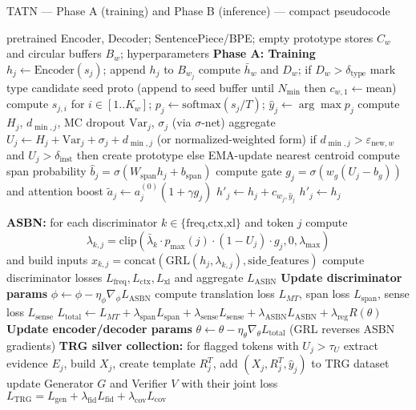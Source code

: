 \documentclass[11pt]{article}
\begin{document}
\begin{algorithm}
\caption{TATN — Phase A (training) and Phase B (inference) — compact pseudocode}
\begin{algorithmic}[1]
\Require pretrained Encoder, Decoder; SentencePiece/BPE; empty prototype stores $C_w$ and circular buffers $B_w$; hyperparameters
\State \textbf{Phase A: Training}
    \State $h_j \leftarrow \mathrm{Encoder}(s_j)$; append $h_j$ to $B_{w_j}$
  \EndFor
    \State compute $\bar h_w$ and $D_w$; if $D_w>\delta_{\text{type}}$ mark type candidate
  \EndFor
      \State seed proto (append to seed buffer until $N_{\min}$ then $c_{w,1}\leftarrow$mean)
    \Else
      \State compute $s_{j,i}$ for $i\in[1..K_w]$; $p_{j}\leftarrow\mathrm{softmax}(s_{j}/T)$; $\hat y_j\leftarrow\arg\max p_j$
      \State compute $H_j$, $d_{\min,j}$, MC dropout $\mathrm{Var}_j$, $\sigma_j$ (via $\sigma$-net)
      \State aggregate $U_j \leftarrow H_j + \mathrm{Var}_j + \sigma_j + d_{\min,j}$ (or normalized-weighted form)
      \State if $d_{\min,j}>\varepsilon_{\text{new},w}$ and $U_j>\delta_{\text{inst}}$ then create prototype else EMA-update nearest centroid
    \EndIf
    \State compute span probability $\hat b_j=\sigma(W_{\text{span}}h_j+b_{\text{span}})$
    \State compute gate $g_j=\sigma(w_g(U_j-b_g))$ and attention boost $\tilde a_j \leftarrow a_j^{(0)}(1+\gamma g_j)$
      \State $h'_j \leftarrow h_j + c_{w_j,\hat y_j}$
    \Else
      \State $h'_j \leftarrow h_j$
    \EndIf
  \EndFor

  \State \textbf{ASBN:} for each discriminator $k\in\{\text{freq,ctx,xl}\}$ and token $j$ compute
    \[
    \lambda_{k,j}=\mathrm{clip}(\bar\lambda_k\cdot p_{\max}(j)\cdot(1-U_j)\cdot g_j,0,\lambda_{\max})
    \]
    and build inputs $x_{k,j}=\mathrm{concat}(\mathrm{GRL}(h_j,\lambda_{k,j}),\text{side\_features})$
  \State compute discriminator losses $L_{\text{freq}},L_{\text{ctx}},L_{\text{xl}}$ and aggregate $L_{\text{ASBN}}$
  \State \textbf{Update discriminator params } $\phi \leftarrow \phi - \eta_\phi \nabla_\phi L_{\text{ASBN}}$
  \State compute translation loss $L_{MT}$, span loss $L_{\text{span}}$, sense loss $L_{\text{sense}}$
  \State $L_{\text{total}} \leftarrow L_{MT} + \lambda_{\text{span}}L_{\text{span}} + \lambda_{\text{sense}}L_{\text{sense}} + \lambda_{\text{ASBN}} L_{\text{ASBN}} + \lambda_{\text{reg}}R(\theta)$
  \State \textbf{Update encoder/decoder params } $\theta \leftarrow \theta - \eta_\theta \nabla_\theta L_{\text{total}}$ (GRL reverses ASBN gradients)
  \State \textbf{TRG silver collection:} for flagged tokens with $U_j>\tau_U$ extract evidence $E_j$, build $X_j$, create template $R_j^T$, add $(X_j,R_j^T,\hat y_j)$ to TRG dataset
  \State update Generator $G$ and Verifier $V$ with their joint loss $L_{\text{TRG}}=L_{\text{gen}}+\lambda_{\text{fid}}L_{\text{fid}}+\lambda_{\text{cov}}L_{\text{cov}}$
  \EndFor
\end{algorithmic}
\end{algorithm}
\end{document}
